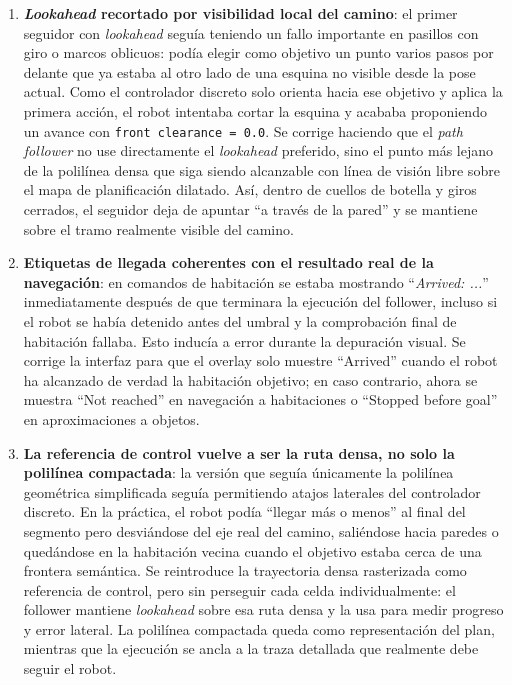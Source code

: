 \documentclass[11pt,a4paper]{article}
\begin{document}
\begin{enumerate}
  \item \textbf{\textit{Lookahead} recortado por visibilidad local del camino}:
        el primer seguidor con \textit{lookahead} seguía teniendo un fallo
        importante en pasillos con giro o marcos oblicuos: podía elegir como
        objetivo un punto varios pasos por delante que ya estaba al otro lado
        de una esquina no visible desde la pose actual. Como el controlador
        discreto solo orienta hacia ese objetivo y aplica la primera acción,
        el robot intentaba cortar la esquina y acababa proponiendo un avance
        con \texttt{front clearance = 0.0}. Se corrige haciendo que el
        \textit{path follower} no use directamente el \textit{lookahead}
        preferido, sino el punto más lejano de la polilínea densa que siga
        siendo alcanzable con línea de visión libre sobre el mapa de
        planificación dilatado. Así, dentro de cuellos de botella y giros
        cerrados, el seguidor deja de apuntar ``a través de la pared'' y se
        mantiene sobre el tramo realmente visible del camino.

  \item \textbf{Etiquetas de llegada coherentes con el resultado real de la
        navegación}: en comandos de habitación se estaba mostrando
        ``\textit{Arrived: ...}'' inmediatamente después de que terminara la
        ejecución del follower, incluso si el robot se había detenido antes del
        umbral y la comprobación final de habitación fallaba. Esto inducía a
        error durante la depuración visual. Se corrige la interfaz para que el
        overlay solo muestre ``Arrived'' cuando el robot ha alcanzado de verdad
        la habitación objetivo; en caso contrario, ahora se muestra
        ``Not reached'' en navegación a habitaciones o ``Stopped before goal''
        en aproximaciones a objetos.

  \item \textbf{La referencia de control vuelve a ser la ruta densa, no solo
        la polilínea compactada}: la versión que seguía únicamente la
        polilínea geométrica simplificada seguía permitiendo atajos laterales
        del controlador discreto. En la práctica, el robot podía ``llegar más
        o menos'' al final del segmento pero desviándose del eje real del
        camino, saliéndose hacia paredes o quedándose en la habitación vecina
        cuando el objetivo estaba cerca de una frontera semántica. Se
        reintroduce la trayectoria densa rasterizada como referencia de
        control, pero sin perseguir cada celda individualmente: el follower
        mantiene \textit{lookahead} sobre esa ruta densa y la usa para medir
        progreso y error lateral. La polilínea compactada queda como
        representación del plan, mientras que la ejecución se ancla a la traza
        detallada que realmente debe seguir el robot.


\end{enumerate}
\end{document}
